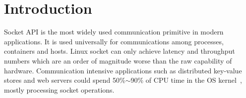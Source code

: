 \section{Introduction}
\label{sec:intro}


Socket API is the most widely used communication primitive in modern applications. It is used universally for communications among processes, containers and hosts.
Linux socket can only achieve latency and throughput numbers which are an order of magnitude worse than the raw capability of hardware.
Communication intensive applications such as distributed key-value stores and web servers could spend 50\%$\sim$90\% of CPU time in the OS kernel~\cite{jeong2014mtcp}, mostly processing socket operations.

